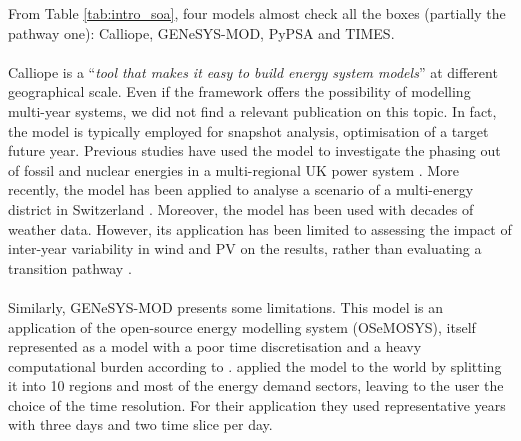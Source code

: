 \newpage
From Table \ref{tab:intro_soa}, four models almost check all the boxes (partially the pathway one): Calliope, GENeSYS-MOD, PyPSA and TIMES. \\

\\

\noindent
Calliope is a ``\emph{tool that makes it easy to build energy system models}'' at different geographical scale. Even if the framework offers the possibility of modelling multi-year systems, we did not find a relevant publication on this topic. In fact, the model is typically employed for snapshot analysis, \ie optimisation of a target future year. Previous studies have used the model to investigate the phasing out of fossil and nuclear energies in a multi-regional UK power system \cite{pfenninger2015renewables}. More recently, the model has been applied to analyse a scenario of a multi-energy district in Switzerland \cite{pickering2021quantifying}. Moreover, the model has been used with decades of weather data. However, its application has been limited to assessing the impact of inter-year variability in wind and PV on the results, 
rather than evaluating a transition pathway \cite{pfenninger2017dealing}. \\

\\

\noindent
Similarly, GENeSYS-MOD presents some limitations. This model is an application of the open-source energy modelling system (OSeMOSYS), itself represented as a model with a poor time discretisation and a heavy computational burden according to \cite{prina2019transition}. \citet{loffler2017designing} applied the model to the world by splitting it into 10 regions and most of the energy demand sectors, leaving to the user the choice of the time resolution.  For their application they used representative years with three days and two time slice per day. \\

